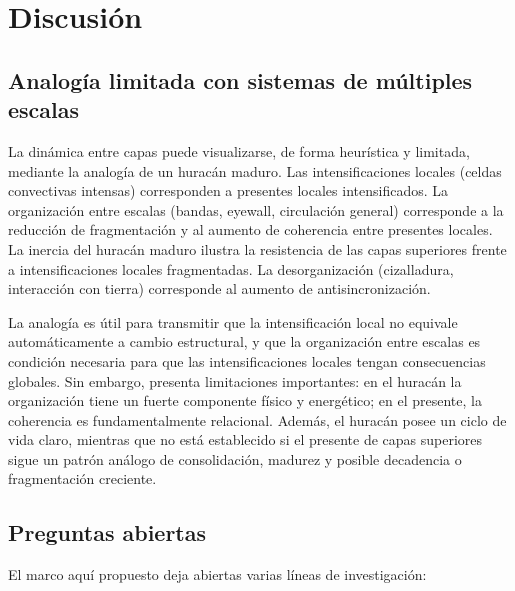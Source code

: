 \section{Discusión}

\subsection{Analogía limitada con sistemas de múltiples escalas}

La dinámica entre capas puede visualizarse, de forma heurística y limitada, mediante la analogía de un huracán maduro. Las intensificaciones locales (celdas convectivas intensas) corresponden a presentes locales intensificados. La organización entre escalas (bandas, eyewall, circulación general) corresponde a la reducción de fragmentación y al aumento de coherencia entre presentes locales. La inercia del huracán maduro ilustra la resistencia de las capas superiores frente a intensificaciones locales fragmentadas. La desorganización (cizalladura, interacción con tierra) corresponde al aumento de antisincronización.

La analogía es útil para transmitir que la intensificación local no equivale automáticamente a cambio estructural, y que la organización entre escalas es condición necesaria para que las intensificaciones locales tengan consecuencias globales. Sin embargo, presenta limitaciones importantes: en el huracán la organización tiene un fuerte componente físico y energético; en el presente, la coherencia es fundamentalmente relacional. Además, el huracán posee un ciclo de vida claro, mientras que no está establecido si el presente de capas superiores sigue un patrón análogo de consolidación, madurez y posible decadencia o fragmentación creciente.

\subsection{Preguntas abiertas}

El marco aquí propuesto deja abiertas varias líneas de investigación:

